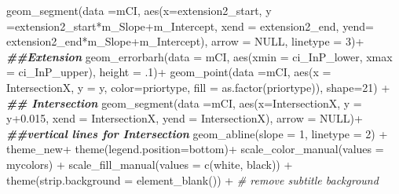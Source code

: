 \documentclass[
]{article}
\newenvironment{Shaded}{\begin{snugshade}}{\end{snugshade}}
\newcommand{\AttributeTok}[1]{\textcolor[rgb]{0.77,0.63,0.00}{#1}}
\newcommand{\CommentTok}[1]{\textcolor[rgb]{0.56,0.35,0.01}{\textit{#1}}}
\newcommand{\ConstantTok}[1]{\textcolor[rgb]{0.00,0.00,0.00}{#1}}
\newcommand{\DecValTok}[1]{\textcolor[rgb]{0.00,0.00,0.81}{#1}}
\newcommand{\DocumentationTok}[1]{\textcolor[rgb]{0.56,0.35,0.01}{\textbf{\textit{#1}}}}
\newcommand{\FloatTok}[1]{\textcolor[rgb]{0.00,0.00,0.81}{#1}}
\newcommand{\FunctionTok}[1]{\textcolor[rgb]{0.00,0.00,0.00}{#1}}
\newcommand{\NormalTok}[1]{#1}
\newcommand{\SpecialCharTok}[1]{\textcolor[rgb]{0.00,0.00,0.00}{#1}}
\newcommand{\StringTok}[1]{\textcolor[rgb]{0.31,0.60,0.02}{#1}}
\begin{document}
\begin{Shaded}
\begin{Highlighting}[]
  \FunctionTok{geom\_segment}\NormalTok{(}\AttributeTok{data =}\NormalTok{mCI, }\FunctionTok{aes}\NormalTok{(}\AttributeTok{x=}\NormalTok{extension2\_start, }\AttributeTok{y =}\NormalTok{extension2\_start}\SpecialCharTok{*}\NormalTok{m\_Slope}\SpecialCharTok{+}\NormalTok{m\_Intercept, }\AttributeTok{xend =}\NormalTok{ extension2\_end, }\AttributeTok{yend=}\NormalTok{ extension2\_end}\SpecialCharTok{*}\NormalTok{m\_Slope}\SpecialCharTok{+}\NormalTok{m\_Intercept), }\AttributeTok{arrow =} \ConstantTok{NULL}\NormalTok{, }\AttributeTok{linetype =} \DecValTok{3}\NormalTok{)}\SpecialCharTok{+}  \DocumentationTok{\#\#Extension}
  \FunctionTok{geom\_errorbarh}\NormalTok{(}\AttributeTok{data =}\NormalTok{ mCI, }\FunctionTok{aes}\NormalTok{(}\AttributeTok{xmin =}\NormalTok{ ci\_InP\_lower, }\AttributeTok{xmax =}\NormalTok{ ci\_InP\_upper), }\AttributeTok{height =}\NormalTok{ .}\DecValTok{1}\NormalTok{)}\SpecialCharTok{+} 
  \FunctionTok{geom\_point}\NormalTok{(}\AttributeTok{data =}\NormalTok{mCI, }\FunctionTok{aes}\NormalTok{(}\AttributeTok{x =}\NormalTok{ IntersectionX, }\AttributeTok{y =}\NormalTok{ y, }\AttributeTok{color=}\NormalTok{priortype, }\AttributeTok{fill =} \FunctionTok{as.factor}\NormalTok{(priortype)), }\AttributeTok{shape=}\DecValTok{21}\NormalTok{) }\SpecialCharTok{+} \DocumentationTok{\#\# Intersection }
  \FunctionTok{geom\_segment}\NormalTok{(}\AttributeTok{data =}\NormalTok{mCI, }\FunctionTok{aes}\NormalTok{(}\AttributeTok{x=}\NormalTok{IntersectionX, }\AttributeTok{y =}\NormalTok{ y}\FloatTok{+0.015}\NormalTok{, }\AttributeTok{xend =}\NormalTok{ IntersectionX, }\AttributeTok{yend =}\NormalTok{ IntersectionX), }\AttributeTok{arrow =} \ConstantTok{NULL}\NormalTok{)}\SpecialCharTok{+} \DocumentationTok{\#\#vertical lines for Intersection}
  \FunctionTok{geom\_abline}\NormalTok{(}\AttributeTok{slope =} \DecValTok{1}\NormalTok{, }\AttributeTok{linetype =} \DecValTok{2}\NormalTok{) }\SpecialCharTok{+}
\NormalTok{  theme\_new}\SpecialCharTok{+} \FunctionTok{theme}\NormalTok{(}\AttributeTok{legend.position=}\StringTok{\textquotesingle{}bottom\textquotesingle{}}\NormalTok{)}\SpecialCharTok{+} 
  \FunctionTok{scale\_color\_manual}\NormalTok{(}\AttributeTok{values =}\NormalTok{ mycolors) }\SpecialCharTok{+}
  \FunctionTok{scale\_fill\_manual}\NormalTok{(}\AttributeTok{values =} \FunctionTok{c}\NormalTok{(}\StringTok{\textquotesingle{}white\textquotesingle{}}\NormalTok{, }\StringTok{\textquotesingle{}black\textquotesingle{}}\NormalTok{)) }\SpecialCharTok{+}
  \FunctionTok{theme}\NormalTok{(}\AttributeTok{strip.background =} \FunctionTok{element\_blank}\NormalTok{()) }\SpecialCharTok{+} \CommentTok{\# remove subtitle background}

\end{Highlighting}
\end{Shaded}
\end{document}
